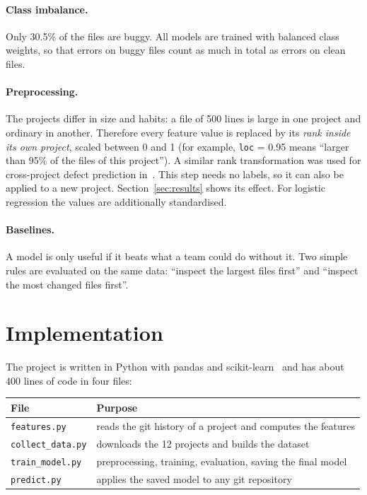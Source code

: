 \documentclass[11pt,a4paper]{article}
\begin{document}
\paragraph{Class imbalance.} Only 30.5\% of the files are buggy. All models
are trained with balanced class weights, so that errors on buggy files count
as much in total as errors on clean files.

\paragraph{Preprocessing.} The projects differ in size and habits: a file of
500 lines is large in one project and ordinary in another. Therefore every
feature value is replaced by its \emph{rank inside its own project}, scaled
between 0 and 1 (for example, \texttt{loc} = 0.95 means ``larger than 95\% of
the files of this project''). A similar rank transformation was used for
cross-project defect prediction in~\cite{zhang}. This step needs no labels, so
it can also be applied to a new project. Section~\ref{sec:results} shows its
effect. For logistic regression the values are additionally standardised.

\paragraph{Baselines.} A model is only useful if it beats what a team could do
without it. Two simple rules are evaluated on the same data: ``inspect the
largest files first'' and ``inspect the most changed files first''.

\section{Implementation}

The project is written in Python with pandas and scikit-learn~\cite{sklearn}
and has about 400 lines of code in four files:

\begin{center}
\begin{tabular}{ll}
\toprule
File & Purpose \\
\midrule
\texttt{features.py} & reads the git history of a project and computes the features \\
\texttt{collect\_data.py} & downloads the 12 projects and builds the dataset \\
\texttt{train\_model.py} & preprocessing, training, evaluation, saving the final model \\
\texttt{predict.py} & applies the saved model to any git repository \\
\bottomrule
\end{tabular}
\end{center}
\end{document}
